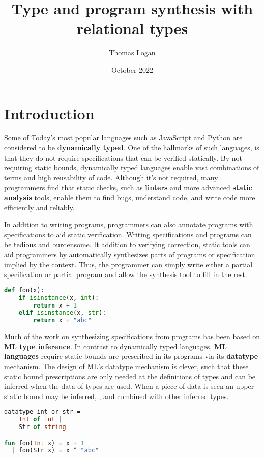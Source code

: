 \documentclass[sigplan,screen]{acmart}
\title{Type and program synthesis with relational types}
\author{Thomas Logan}
\date{October 2022}
\begin{document}
\maketitle

\section{Introduction}
Some of Today's most popular languages such as JavaScript and Python are considered to be \textbf{dynamically typed}.
One of the hallmarks of such languages, is that they do not require specifications 
that can be verified statically. By not requiring static bounds, dynamically typed languages
enable vast combinations of terms and high reusability of code. 
Although it's not required, many programmers find that
static checks, such as \textbf{linters} and more advanced \textbf{static analysis} tools, 
enable them to find bugs, understand code, and write code more efficiently and reliably. 

In addition to writing programs, programmers can also annotate programs with specifications to
aid static verification. Writing specifications and programs can be tedious and burdensome.  
It addition to verifying correction, static tools can aid programmers by automatically synthesizes
parts of programs or specification implied by the context. Thus, the programmer can simply write
either a partial specification or partial program and allow the synthesis tool to fill in the rest.   

\begin{lstlisting}[language=Python]
def foo(x):
    if isinstance(x, int):
        return x + 1 
    elif isinstance(x, str): 
        return x + "abc"
\end{lstlisting}

Much of the work on synthesizing specifications from programs has been based on \textbf{ML type inference}.
In contrast to dynamically typed languages, \textbf{ML languages} require static bounds are prescribed 
in its programs via its \textbf{datatype} mechanism. The design of ML's datatype mechanism is clever, 
such that these static bound prescriptions are only needed at the definitions of types and can be 
inferred when the data of types are used. When a piece of data is seen an upper static bound 
may be inferred, , and combined with other inferred types.

\begin{lstlisting}[language=ML]
datatype int_or_str = 
    Int of int | 
    Str of string

fun foo(Int x) = x + 1
  | foo(Str x) = x ^ "abc"
\end{lstlisting}
\end{document}
